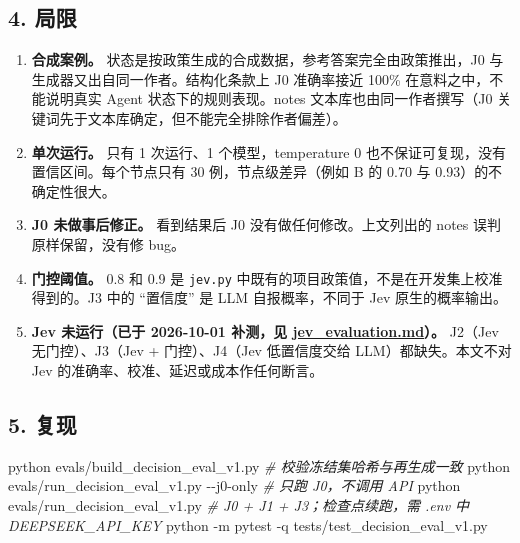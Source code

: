 \documentclass[
  10pt,
]{ctexart}
\newenvironment{Shaded}{}{}
\newcommand{\AttributeTok}[1]{\textcolor[rgb]{0.49,0.56,0.16}{#1}}
\newcommand{\CommentTok}[1]{\textcolor[rgb]{0.38,0.63,0.69}{\textit{#1}}}
\newcommand{\ExtensionTok}[1]{#1}
\newcommand{\NormalTok}[1]{#1}
\providecommand{\tightlist}{%
  \setlength{\itemsep}{0pt}\setlength{\parskip}{0pt}}
\begin{document}
\subsection{4. 局限}\label{4-ux5c40ux9650}

\begin{enumerate}
\def\labelenumi{\arabic{enumi}.}
\tightlist
\item
  \textbf{合成案例。}
  状态是按政策生成的合成数据，参考答案完全由政策推出，J0
  与生成器又出自同一作者。结构化条款上 J0 准确率接近 100\%
  在意料之中，不能说明真实 Agent 状态下的规则表现。notes
  文本库也由同一作者撰写（J0
  关键词先于文本库确定，但不能完全排除作者偏差）。
\item
  \textbf{单次运行。} 只有 1 次运行、1 个模型，temperature 0
  也不保证可复现，没有置信区间。每个节点只有 30 例，节点级差异（例如 B
  的 0.70 与 0.93）的不确定性很大。
\item
  \textbf{J0 未做事后修正。} 看到结果后 J0 没有做任何修改。上文列出的
  notes 误判原样保留，没有修 bug。
\item
  \textbf{门控阈值。} 0.8 和 0.9 是 \texttt{jev.\allowbreak{}py}
  中既有的项目政策值，不是在开发集上校准得到的。J3 中的 ``置信度'' 是
  LLM 自报概率，不同于 Jev 原生的概率输出。
\item
  \textbf{Jev 未运行（已于 2026-10-01 补测，见
  \url{jev_evaluation.md}）。} J2（Jev 无门控）、J3（Jev +
  门控）、J4（Jev 低置信度交给 LLM）都缺失。本文不对 Jev
  的准确率、校准、延迟或成本作任何断言。
\end{enumerate}

\subsection{5. 复现}\label{5-ux590dux73b0}

\begin{Shaded}
\begin{Highlighting}[]
\ExtensionTok{python}\NormalTok{ evals/build\_decision\_eval\_v1.py              }\CommentTok{\# 校验冻结集哈希与再生成一致}
\ExtensionTok{python}\NormalTok{ evals/run\_decision\_eval\_v1.py }\AttributeTok{{-}{-}j0{-}only}      \CommentTok{\# 只跑 J0，不调用 API}
\ExtensionTok{python}\NormalTok{ evals/run\_decision\_eval\_v1.py                }\CommentTok{\# J0 + J1 + J3；检查点续跑，需 .env 中 DEEPSEEK\_API\_KEY}
\ExtensionTok{python} \AttributeTok{{-}m}\NormalTok{ pytest }\AttributeTok{{-}q}\NormalTok{ tests/test\_decision\_eval\_v1.py}
\end{Highlighting}
\end{Shaded}
\end{document}
